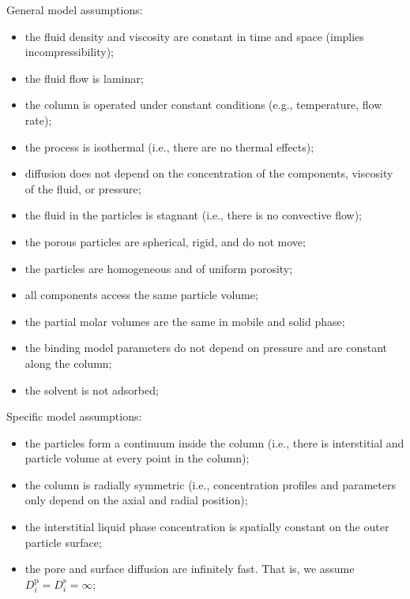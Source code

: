 \documentclass{article}
\begin{document}
General model assumptions:
\begin{itemize}
    \item the fluid density and viscosity are constant in time and space (implies incompressibility);
    \item the fluid flow is laminar;
    \item the column is operated under constant conditions (e.g., temperature, flow rate);
    \item the process is isothermal (i.e., there are no thermal effects);
    \item diffusion does not depend on the concentration of the components, viscosity of the fluid, or pressure;
    \item the fluid in the particles is stagnant (i.e., there is no convective flow);
    \item the porous particles are spherical, rigid, and do not move;
    \item the particles are homogeneous and of uniform porosity;
    \item all components access the same particle volume;
    \item the partial molar volumes are the same in mobile and solid phase;
    \item the binding model parameters do not depend on pressure and are constant along the column;
    \item the solvent is not adsorbed;
\end{itemize}

Specific model assumptions:
\begin{itemize}
    \item the particles form a continuum inside the column (i.e., there is interstitial and particle volume at every point in the column);
    \item the column is radially symmetric (i.e., concentration profiles and parameters only depend on the axial and radial position);
    \item the interstitial liquid phase concentration is spatially constant on the outer particle surface;
    \item the pore and surface diffusion are infinitely fast. That is, we assume $D^{\mathrm{p}}_{i} = D^{\mathrm{s}}_{i} = \infty$;
\end{itemize}
\end{document}
